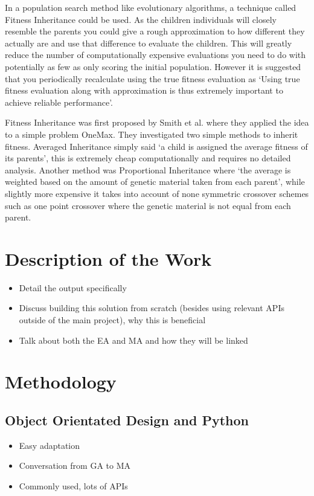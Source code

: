 \documentclass[a4paper]{article}
\begin{document}
In a population search method like evolutionary algorithms, a technique called Fitness Inheritance could be used.
As the children individuals will closely resemble the parents you could give a rough approximation to how different they actually are and use that difference to evaluate the children.
This will greatly reduce the number of computationally expensive evaluations you need to do with potentially as few as only scoring the initial population.
However it is suggested that you periodically recalculate using the true fitness evaluation as `Using true fitness evaluation along with approximation is thus extremely important to achieve reliable performance'.
\par
Fitness Inheritance was first proposed by Smith et al.\cite{fitnessInheritance} where they applied the idea to a simple problem OneMax.
They investigated two simple methods to inherit fitness.
Averaged Inheritance simply said `a child is assigned the average fitness of its parents', this is extremely cheap computationally and requires no detailed analysis.
Another method was Proportional Inheritance where `the average is weighted based on the amount of genetic material taken from each parent', while slightly more expensive it takes into account of none symmetric crossover schemes such as one point crossover where the genetic material is not equal from each parent.

\section{Description of the Work}
\begin{itemize}
    \item Detail the output specifically
    \item Discuss building this solution from scratch (besides using relevant APIs outside of the main project), why this is beneficial
    \item Talk about both the EA and MA and how they will be linked
\end{itemize}

\section{Methodology}
\subsection{Object Orientated Design and Python}
\begin{itemize}
    \item Easy adaptation
    \item Conversation from GA to MA
    \item Commonly used, lots of APIs
\end{itemize}
\end{document}
